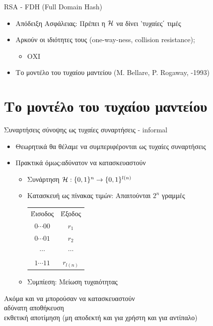 \documentclass[handout]{beamer}
\begin{document}
\begin{frame}[allowframebreaks]{RSA - FDH (Full Domain Hash)}
\begin{itemize}
\item Απόδειξη Ασφάλειας: Πρέπει η $\mathcal{H}$ να δίνει 'τυχαίες΄ τιμές
\item Αρκούν οι ιδιότητες τους (one-way-ness, collision resistance); 
\begin{itemize}
\item \alert{ΟΧΙ}
\end{itemize}
\item Το μοντέλο του τυχαίου μαντείου (M. Bellare, P. Rogaway, -1993)
\end{itemize}
\end{frame}

 
\section{Το μοντέλο του τυχαίου μαντείου}

\begin{frame}{Συναρτήσεις σύνοψης ως τυχαίες συναρτήσεις - informal}
\begin{itemize}
\item Θεωρητικά θα θέλαμε να συμπεριφέρονται ως τυχαίες συναρτήσεις
\pause
\item Πρακτικά όμως:\alert{αδύνατον να κατασκευαστούν}
\pause
\begin{itemize}
\item Συνάρτηση $\mathcal{H}: \{0,1\}^n \rightarrow \{ 0,1 \}^{l(n)}$
\pause
\item Κατασκευή ως πίνακας τιμών: Απαιτούνται $2^n$ γραμμές
\begin{tabular}{|c|c|}
Έισοδος & Έξοδος \\
$0\cdots00$ & $r_1$ \\
$0\cdots01$ & $r_2$\\
$\cdots$ & $\cdots$\\
$1\cdots11$ & $r_{l(n)}$\\
\end{tabular}
\pause
\item Συμπίεση: Μείωση τυχαιότητας
\end{itemize}
\end{itemize}
\pause
Ακόμα και να μπορούσαν να κατασκευαστούν \\
αδύνατη αποθήκευση\\
εκθετική αποτίμηση (μη αποδεκτή και για χρήστη και για αντίπαλο)
\end{frame}
\end{document}
